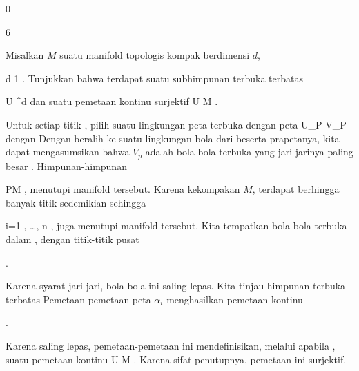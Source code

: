 {0}

{

}
{  }



{6}

{

Misalkan $M$ suatu manifold topologis kompak berdimensi $d$,

\mavergleichskette
{\vergleichskette
{ d
}
{ \geq }{ 1
}
{  }{
}
{    }{
}
{   }{
}
}
{}{}{.}
Tunjukkan bahwa terdapat suatu subhimpunan terbuka terbatas

\mavergleichskette
{\vergleichskette
{ U
}
{ \subseteq }{ \R^d
}
{  }{
}
{    }{
}
{   }{
}
}
{}{}{}
dan suatu pemetaan kontinu surjektif
\maabbdisp {\varphi} { U } { M
} {}
.

}
{

Untuk setiap titik
, pilih suatu lingkungan peta terbuka
 dengan peta
 {U_P } {V_P
} {}
dengan
 Dengan beralih ke suatu lingkungan bola dari
 beserta prapetanya, kita dapat mengasumsikan bahwa $V_p$ adalah bola-bola terbuka yang jari-jarinya paling besar
. Himpunan-himpunan

 {}
 {P\in M} {}
 {} {} {} {,}
menutupi manifold tersebut. Karena kekompakan $M$, terdapat berhingga banyak titik
 sedemikian sehingga

 {}
 {i=1 , \ldots , n} {}
 {} {} {} {,}
juga menutupi manifold tersebut. Kita tempatkan bola-bola terbuka
 dalam
 {} {},
dengan titik-titik pusat

 { . }

Karena syarat jari-jari, bola-bola ini saling lepas. Kita tinjau himpunan terbuka terbatas
 Pemetaan-pemetaan peta $\alpha_i$ menghasilkan pemetaan kontinu

 { . }

Karena saling lepas, pemetaan-pemetaan ini mendefinisikan, melalui
 apabila
, suatu pemetaan kontinu
\maabbdisp {\varphi} { U } {M
} {.}
Karena sifat penutupnya, pemetaan ini surjektif.

 }



